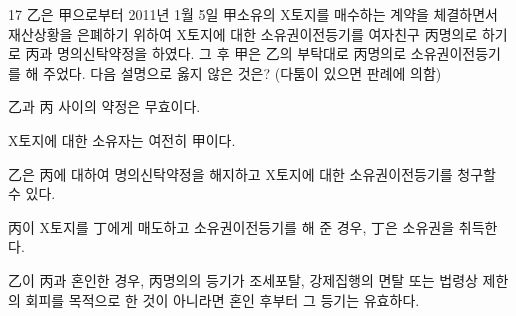 \begin{question}{17}
乙은 甲으로부터 2011년 1월 5일 甲소유의 X토지를 매수하는 계약을 체결하면서 재산상황을 은폐하기 위하여 X토지에 대한 소유권이전등기를 여자친구 丙명의로 하기로 丙과 명의신탁약정을 하였다. 그 후 甲은 乙의 부탁대로 丙명의로 소유권이전등기를 해 주었다. 다음 설명으로 옳지 않은 것은? (다툼이 있으면 판례에 의함)
\begin{choices}
  \item 乙과 丙 사이의 약정은 무효이다.
  \item X토지에 대한 소유자는 여전히 甲이다.
  \item 乙은 丙에 대하여 명의신탁약정을 해지하고 X토지에 대한 소유권이전등기를 청구할 수 있다.
  \item 丙이 X토지를 丁에게 매도하고 소유권이전등기를 해 준 경우, 丁은 소유권을 취득한다.
  \item 乙이 丙과 혼인한 경우, 丙명의의 등기가 조세포탈, 강제집행의 면탈 또는 법령상 제한의 회피를 목적으로 한 것이 아니라면 혼인 후부터 그 등기는 유효하다.
\end{choices}
\end{question}
